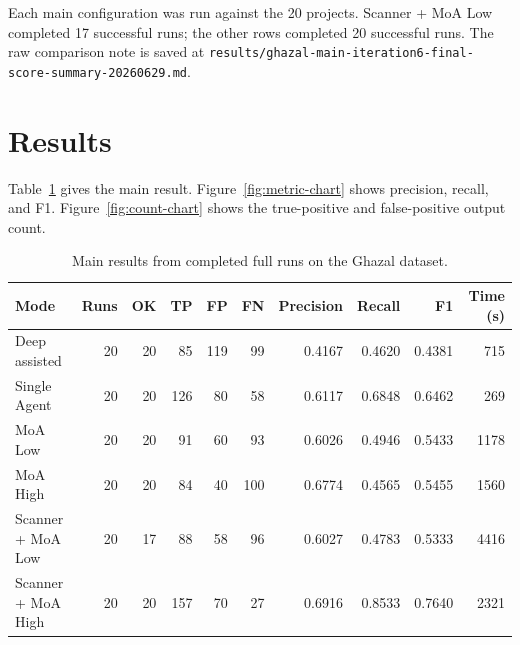 \documentclass[sigconf,nonacm]{acmart}
\newcommand{\ResultsPath}{\texttt{results/ghazal-main-iteration6-final-score-summary-20260629.md}}
\begin{document}
Each main configuration was run against the 20 projects. Scanner + MoA Low completed 17 successful runs; the other rows completed 20 successful runs. The raw comparison note is saved at \ResultsPath.

\section{Results}
Table~\ref{tab:main-results} gives the main result. Figure~\ref{fig:metric-chart} shows precision, recall, and F1. Figure~\ref{fig:count-chart} shows the true-positive and false-positive output count.

\begin{table}[!htbp]
  \centering
  \caption{Main results from completed full runs on the Ghazal dataset.}
  \label{tab:main-results}
  \begin{tabular}{lrrrrrrrrr}
    \toprule
    Mode & Runs & OK & TP & FP & FN & Precision & Recall & F1 & Time (s) \\
    \midrule
    Deep assisted & 20 & 20 & 85 & 119 & 99 & 0.4167 & 0.4620 & 0.4381 & 715 \\
    Single Agent & 20 & 20 & 126 & 80 & 58 & 0.6117 & 0.6848 & 0.6462 & 269 \\
    MoA Low & 20 & 20 & 91 & 60 & 93 & 0.6026 & 0.4946 & 0.5433 & 1178 \\
    MoA High & 20 & 20 & 84 & 40 & 100 & 0.6774 & 0.4565 & 0.5455 & 1560 \\
    Scanner + MoA Low & 20 & 17 & 88 & 58 & 96 & 0.6027 & 0.4783 & 0.5333 & 4416 \\
    Scanner + MoA High & 20 & 20 & 157 & 70 & 27 & 0.6916 & 0.8533 & 0.7640 & 2321 \\
    \bottomrule
  \end{tabular}
\end{table}
\end{document}

